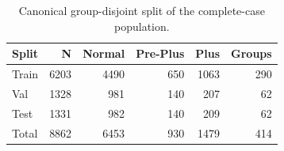 \begin{table}[htbp]
\centering
\small
\caption{Canonical group-disjoint split of the complete-case population.}
\label{tab:split}
\begin{tabular}{lrrrrr}
\toprule
Split & N & Normal & Pre-Plus & Plus & Groups \\
\midrule
Train & 6203 & 4490 & 650 & 1063 & 290 \\
Val & 1328 & 981 & 140 & 207 & 62 \\
Test & 1331 & 982 & 140 & 209 & 62 \\
Total & 8862 & 6453 & 930 & 1479 & 414 \\
\bottomrule
\end{tabular}
\end{table}
